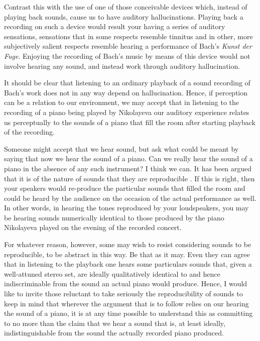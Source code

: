 \documentclass[sloppy, journal, git, bytitle, dodraft]{humapap}
\begin{document}
Contrast this with the use of one of those conceivable devices which, instead of playing back sounds, cause us to have auditory hallucinations. Playing back a recording on such a device would result your having a series of auditory sensations, sensations that in some respects resemble tinnitus and in other, more subjectively salient respects resemble hearing a performance of Bach's \emph{Kunst der Fuge}. Enjoying the recording of Bach's music by means of this device would not involve hearing any sound, and instead work through auditory hallucination. 

It should be clear that listening to an ordinary playback of a sound recording of Bach's work does not in any way depend on hallucination. Hence, if perception can be a relation to our environment, we may accept that in listening to the recording of a piano being played by Nikolayeva our auditory experience relates us perceptually to the sounds of a piano that fill the room after starting playback of the recording.

Someone might accept that we hear sound, but ask what could be meant by saying that now we hear the sound of a piano. Can we really hear the sound of a piano in the absence of any such instrument? I think we can. It has been argued that it is of the nature of sounds that they are reproducible \autocite{martin2012aa}. If this is right, then your speakers would re-produce the particular sounds that filled the room and could be heard by the audience on the occasion of the actual performance as well. In other words, in hearing the tones reproduced by your loudspeakers, you may be hearing sounds numerically identical to those produced by the piano Nikolayeva played on the evening of the recorded concert. 

For whatever reason, however, some may wish to resist considering sounds to be reproducible, to be abstract in this way. Be that as it may. Even they can agree that in listening to the playback one hears some particulars sounds that, given a well-attuned stereo set, are ideally qualitatively identical to and hence indiscriminable from the sound an actual piano would produce. Hence, I would like to invite those reluctant to take seriously the reproducibility of sounds to keep in mind that wherever the argument that is to follow relies on our hearing the sound of a piano, it is at any time possible to understand this as committing to no more than the claim that we hear a sound that is, at least ideally, indistinguishable from the sound the actually recorded piano produced. 
\end{document}

